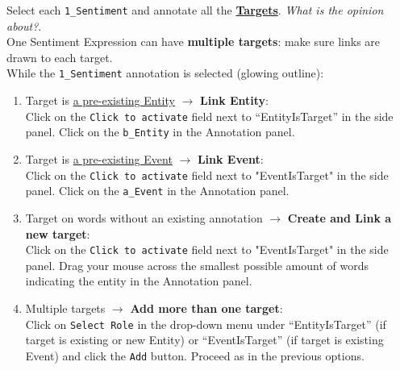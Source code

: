 \begin{steps}[leftmargin=*]
    
    \item \label{step:decidetargets} Select each \texttt{1\_Sentiment} and annotate all the \hyperlink{sec:targetdefinition}{\textbf{Targets}}.
    \textit{What is the opinion about?}.\\
    One Sentiment Expression can have \textbf{multiple targets}: make sure links are drawn to each target.\\
    \textcolor{OliveGreen}{While the \sentimentcolor \texttt{1\_Sentiment} annotation is selected (glowing outline)}:
        \begin{enumerate}[label=\alph*), leftmargin=*]
            \item \label{step:linkentity} Target is \hyperlink{sec:entitydefinition}{a pre-existing \entitycolor Entity} $\rightarrow$ \textbf{Link Entity}:\\
            \textcolor{OliveGreen}{
            Click on the \texttt{Click to activate} field next to ``EntityIsTarget'' in the side panel.
            Click on the \entitycolor \texttt{b\_Entity} in the Annotation panel.
            }
            \item \label{step:linkevent} Target is \hyperlink{sec:eventdefinition}{a pre-existing \eventcolor Event} $\rightarrow$ \textbf{Link Event}:\\
            \textcolor{OliveGreen}{
            Click on the \texttt{Click to activate} field next to "EventIsTarget" in the side panel.
            Click on the \eventcolor \texttt{a\_Event} in the Annotation panel.
            }
            \item \label{step:newtarget} Target on words without an existing annotation $\rightarrow$ \textbf{Create and Link a new target}:\\
            \textcolor{OliveGreen}{
            Click on the \texttt{Click to activate} field next to "EventIsTarget" in the side panel.
            Drag your mouse across the smallest possible amount of words indicating the entity in the Annotation panel.
            }
            \item \label{step:multiple} Multiple targets $\rightarrow$ \textbf{Add more than one target}:\\
            \textcolor{OliveGreen}{
            Click on \texttt{Select Role} in the drop-down menu under ``EntityIsTarget'' (if target is existing or new Entity) or ``EventIsTarget'' (if target is existing Event) and click the \texttt{Add} button. Proceed as in the previous options.
            }
        \end{enumerate}
        

\end{steps}
